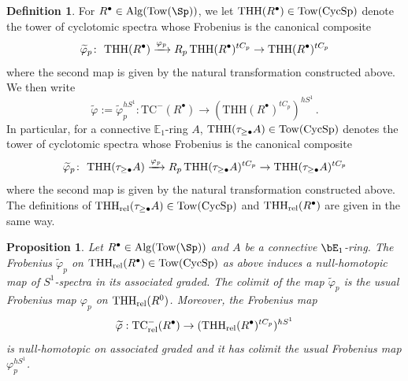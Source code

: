 \documentclass[english,10pt]{amsart}
\newcommand{\rel}{\textup{rel}}
\newtheorem{prop}{Proposition}[section]
\theoremstyle{definition}
\newtheorem{defn}{Definition}[section]
\numberwithin{equation}{section}
\DeclareMathOperator{\thh}{\ensuremath{\textup{THH}}}
\newcommand{\rntc}{\mathrm{TC}_{\rel}^{-}}
\newcommand{\rthh}{\mathrm{THH}_{\rel}}
\DeclareMathOperator{\cycsp}{\ensuremath{\textup{CycSp}}}
\newcommand{\Tow}{\mathrm{Tow}}
\newcommand{\Alg}{\mathrm{Alg}}
\def\co{\colon\thinspace}
\begin{document}
\begin{defn}\label{defi filtered cyclotomic thh}
For $R^{\bullet}\in \Alg(\Tow(\Sp))$, we let 
 $\thh(R^{\bullet}) \in \mathrm{Tow}(\cycsp)$ 
 denote the tower of cyclotomic spectra whose Frobenius is the canonical composite
 \[\widetilde{\varphi}_p \co \thh(R^{\bullet})  \xrightarrow{\varphi_p} R_p\thh(R^{\bullet})^{tC_p} \to \thh(R^{\bullet})^{tC_p}\]
 where the second map is given by the natural transformation constructed above.  We then write 
 \[ \widetilde{\varphi}:=\widetilde{\varphi}_p^{hS^1}: \mathrm{TC}^{-}(R^{\bullet})\longrightarrow (\mathrm{THH}(R^{\bullet})^{tC_p})^{hS^1}\,.
 \]
In particular, for a connective $\mathbb{E}_1$-ring $A$, 
 $\thh(\tau_{\geq \bullet} A) \in \mathrm{Tow}(\cycsp)$ denotes the tower of cyclotomic spectra whose Frobenius is the canonical composite 
 \[\widetilde{\varphi}_p \co \thh(\tau_{\geq \bullet} A)  \xrightarrow{\varphi_p} R_p\thh(\tau_{\geq \bullet} A)^{tC_p} \to \thh(\tau_{\geq \bullet} A)^{tC_p}\]
 where the second map is given by the natural transformation constructed above. The definitions of  $\rthh(\tau_{\geq \bullet} A)\in  \mathrm{Tow}(\cycsp) $ and $\rthh(R^{\bullet})$ are given in the same way.
\end{defn}

\begin{prop}\label{lemm phi vanish in the associated graded}
Let $R^{\bullet}\in \Alg(\Tow(\Sp))$ and $A$ be a connective $\bE_1$-ring. The Frobenius 
$\widetilde{\varphi}_p$
 on $\rthh(R^{\bullet}) \in \mathrm{Tow}(\cycsp)$ as above induces a null-homotopic map of $S^1$-spectra in its associated graded. The colimit of the map $\widetilde{\varphi}_p$ is the usual Frobenius map $\varphi_p$ on $\rthh(R^0)$. 
 Moreover, the Frobenius map 
 \[ \widetilde{\varphi} : \rntc(R^{\bullet})\to (\mathrm{THH}_{\textup{rel}}(R^{\bullet})^{tC_p})^{hS^1}
 \]
 is null-homotopic on associated graded and it has colimit the usual Frobenius map $\varphi_p^{hS^1}$.
\end{prop}
\end{document}
